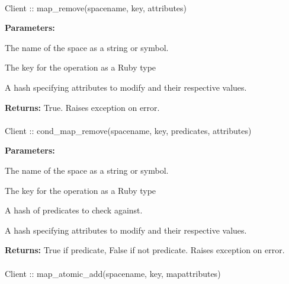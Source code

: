 \paragraph{}
\begin{ccode}
Client :: map_remove(spacename, key, attributes)
\end{ccode}
\funcdesc 

\noindent\textbf{Parameters:}
\begin{description}[labelindent=\widthof{{\code{attributes}}},leftmargin=*,noitemsep,nolistsep,align=right]
\item[\code{spacename}] The name of the space as a string or symbol.
\item[\code{key}] The key for the operation as a Ruby type
\item[\code{attributes}] A hash specifying attributes to modify and their respective values.
\end{description}

\noindent\textbf{Returns:}
True.  Raises exception on error.

\paragraph{}
\begin{ccode}
Client :: cond_map_remove(spacename, key, predicates, attributes)
\end{ccode}
\funcdesc 

\noindent\textbf{Parameters:}
\begin{description}[labelindent=\widthof{{\code{predicates}}},leftmargin=*,noitemsep,nolistsep,align=right]
\item[\code{spacename}] The name of the space as a string or symbol.
\item[\code{key}] The key for the operation as a Ruby type
\item[\code{predicates}] A hash of predicates to check against.
\item[\code{attributes}] A hash specifying attributes to modify and their respective values.
\end{description}

\noindent\textbf{Returns:}
True if predicate, False if not predicate.  Raises exception on error.

\paragraph{}
\begin{ccode}
Client :: map_atomic_add(spacename, key, mapattributes)
\end{ccode}
\funcdesc 

